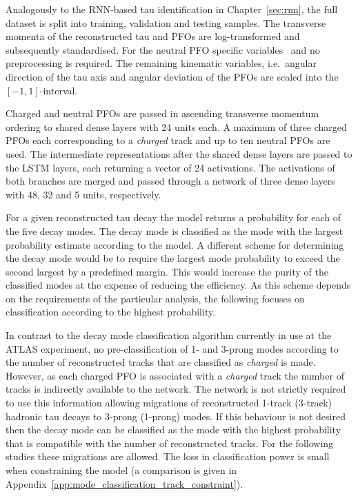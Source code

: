 Analogously to the RNN-based tau identification in Chapter~\ref{sec:rnn}, the
full dataset is split into training, validation and testing samples. The
transverse momenta of the reconstructed tau and PFOs are log-transformed and
subsequently standardised. For the neutral PFO specific
variables~ and
 no preprocessing is required. The
remaining kinematic variables, i.e.\ angular direction of the tau axis and
angular deviation of the PFOs are scaled into the~$[-1, 1]$-interval.

Charged and neutral PFOs are passed in ascending transverse momentum ordering to
shared dense layers with 24 units each. A maximum of three charged PFOs each
corresponding to a \emph{charged} track and up to ten neutral PFOs are used. The
intermediate representations after the shared dense layers are passed to the
LSTM layers, each returning a vector of 24 activations. The activations of both
branches are merged and passed through a network of three dense layers with 48,
32 and 5 units, respectively.

For a given reconstructed tau decay the model returns a probability for each of
the five decay modes. The decay mode is classified as the mode with the largest
probability estimate according to the model. A different scheme for determining
the decay mode would be to require the largest mode probability to exceed the
second largest by a predefined margin. This would increase the purity of the
classified modes at the expense of reducing the efficiency. As this scheme
depends on the requirements of the particular analysis, the following focuses on
classification according to the highest probability.

In contrast to the decay mode classification algorithm currently in use at the
ATLAS experiment, no pre-classification of 1- and 3-prong modes according to the
number of reconstructed tracks that are classified as \emph{charged} is made.
However, as each charged PFO is associated with a \emph{charged} track the
number of tracks is indirectly available to the network. The network is not
strictly required to use this information allowing migrations of reconstructed
1-track (3-track) hadronic tau decays to 3-prong (1-prong) modes. If this
behaviour is not desired then the decay mode can be classified as the mode with
the highest probability that is compatible with the number of reconstructed
tracks. For the following studies these migrations are allowed. The loss in
classification power is small when constraining the model (a comparison is given
in Appendix~\ref{app:mode_classification_track_constraint}).


